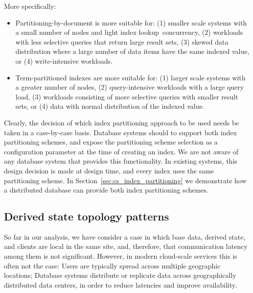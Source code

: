 More specifically:
\begin{itemize}

  \item Partitioning-by-document is more suitable for:
  (1) smaller scale systems with a small number of nodes and light index lookup concurrency,
  (2) workloads with less selective queries that return large result sets,
  (3) skewed data distribution where a large number of data items have the same indexed value,
  or (4) write-intensive workloads.

  \item Term-partitioned indexes are more suitable for:
  (1) larger scale systems with a greater number of nodes,
  (2) query-intensive workloads with a large query load,
  (3) workloads consisting of more selective queries with smaller result sets,
  or (4) data with normal distribution of the indexed value.

\end{itemize}

Clearly, the decision of which index partitioning approach to be used needs be taken in a case-by-case basis.
Database systems should to support both index partitioning schemes, and expose the partitioning scheme selection as a
configuration parameter at the time of creating an index.
We are not aware of any database system that provides this functionality.
In existing systems, this design decision is made at design time, and every index uses the same partitioning scheme.
\cite{kejriwal:slik, tan:diffindex, riakv:secondaryindexes, cassandra:secondaryindexing}
In Section~\ref{sec:cs_index_partitioning} we demonstrate how a distributed database can provide both index partitioning
schemes.


\subsection{Derived state topology patterns}
\label{sec:topology_patterns}


So far in our analysis,
we have consider a case in which base data, derived state, and clients are local in the same site,
and, therefore, that communication latency among them is not significant.
However, in modern cloud-scale services this is often not the case:
Users are typically spread across multiple geographic locations;
Database systems distribute or replicate data across geographically distributed data centers,
in order to reduce latencies and improve availability.


